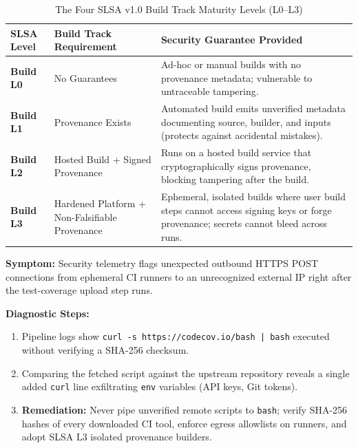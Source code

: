 \begin{table}[htbp]
\centering\small
\begin{tabular}{llp{7.4cm}}
\toprule
\textbf{SLSA Level} & \textbf{Build Track Requirement} & \textbf{Security Guarantee Provided} \\
\midrule
\textbf{Build L0} & No Guarantees & Ad-hoc or manual builds with no provenance metadata; vulnerable to untraceable tampering. \\
\textbf{Build L1} & Provenance Exists & Automated build emits unverified metadata documenting source, builder, and inputs (protects against accidental mistakes). \\
\textbf{Build L2} & Hosted Build + Signed Provenance & Runs on a hosted build service that cryptographically signs provenance, blocking tampering after the build. \\
\textbf{Build L3} & Hardened Platform + Non-Falsifiable Provenance & Ephemeral, isolated builds where user build steps cannot access signing keys or forge provenance; secrets cannot bleed across runs. \\
\bottomrule
\end{tabular}
\caption{The Four SLSA v1.0 Build Track Maturity Levels (L0--L3)}
\label{tab:v3-ch07-slsa}
\end{table}

\begin{realworldbox}
\textbf{Symptom:} Security telemetry flags unexpected outbound HTTPS POST connections from ephemeral CI runners to an unrecognized external IP right after the test-coverage upload step runs.

\textbf{Diagnostic Steps:}
\begin{enumerate}[leftmargin=12pt]
  \item Pipeline logs show \texttt{curl -s https://codecov.io/bash | bash} executed without verifying a SHA-256 checksum.
  \item Comparing the fetched script against the upstream repository reveals a single added \texttt{curl} line exfiltrating \texttt{env} variables (API keys, Git tokens).
  \item \textbf{Remediation:} Never pipe unverified remote scripts to \texttt{bash}; verify SHA-256 hashes of every downloaded CI tool, enforce egress allowlists on runners, and adopt SLSA L3 isolated provenance builders.
\end{enumerate}
\end{realworldbox}

